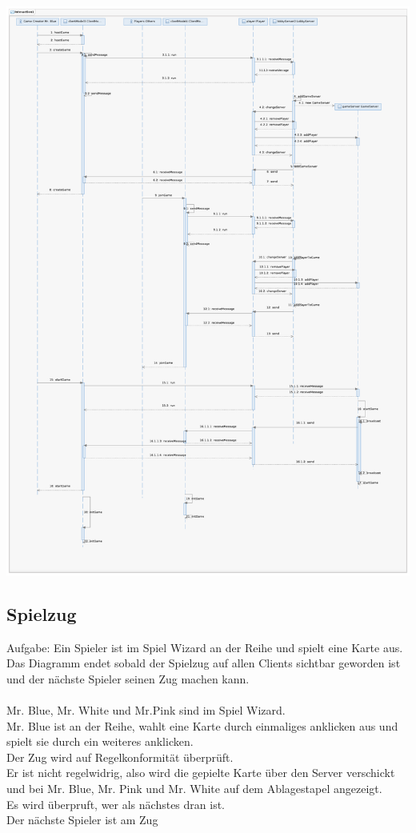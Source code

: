 \documentclass{article}
\begin{document}
\includegraphics[width=\textwidth]{Entwurf_CreateGame}

\subsection{Spielzug}
		Aufgabe: Ein Spieler ist im Spiel Wizard an der Reihe und spielt eine Karte aus.
		Das Diagramm endet sobald der Spielzug auf allen Clients sichtbar
		geworden ist und der nächste Spieler seinen Zug machen kann.\\
		\ \\
		Mr. Blue, Mr. White und Mr.Pink sind im Spiel Wizard. \\
		Mr. Blue ist an der Reihe, wahlt eine Karte durch einmaliges anklicken aus und spielt sie durch ein weiteres anklicken.\\
		Der Zug wird auf Regelkonformität überprüft.\\
		Er ist nicht regelwidrig, also wird die gepielte Karte über den Server verschickt und bei Mr. Blue, Mr. Pink und Mr. White auf dem 	Ablagestapel angezeigt. \\
		Es wird überpruft, wer als nächstes dran ist.\\
		Der nächste Spieler ist am Zug \\
\end{document}
